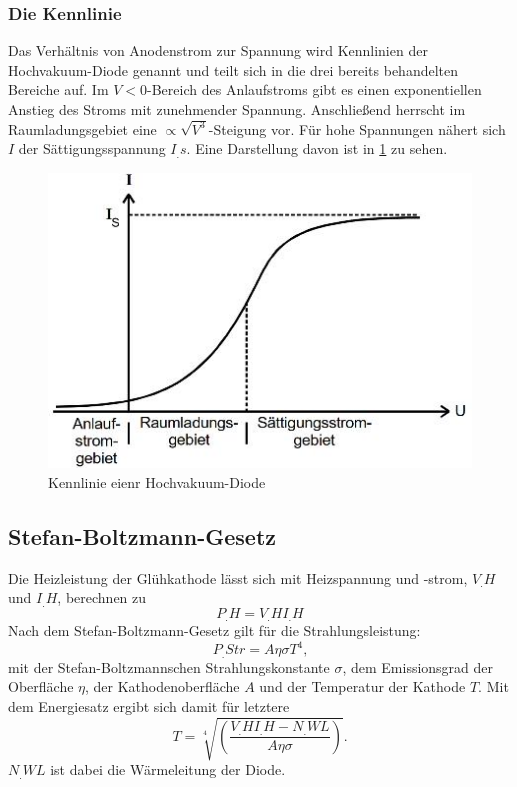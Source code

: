 \subsubsection{Die Kennlinie}
Das Verhältnis von Anodenstrom zur Spannung wird Kennlinien der Hochvakuum-Diode genannt und teilt sich in die drei bereits behandelten Bereiche auf.
Im $V<0$-Bereich des Anlaufstroms gibt es einen exponentiellen Anstieg des Stroms mit zunehmender Spannung. Anschließend herrscht im Raumladungsgebiet eine $\propto \sqrt{V^3}$-Steigung vor. Für hohe Spannungen nähert sich $I$ der Sättigungsspannung $I_.s$. Eine Darstellung davon ist in \ref{fig:Kenn} zu sehen.

\begin{figure}
\centering
\includegraphics[width=\linewidth-70pt,height=\textheight-70pt,keepaspectratio]{content/images/Kennlinie.jpg}
\caption{Kennlinie eienr Hochvakuum-Diode\cite{V504}}
\label{fig:Kenn}
\end{figure}

\subsection{Stefan-Boltzmann-Gesetz}
Die Heizleistung der Glühkathode lässt sich mit Heizspannung und -strom, $V_.H$ und $I_.H$, berechnen zu
\begin{equation*}
P_.H=V_.HI_.H
\end{equation*}
Nach dem Stefan-Boltzmann-Gesetz gilt für die Strahlungsleistung:
\begin{equation*}
P_.{Str}= A\eta\sigma T^4\text{,}
\end{equation*}
mit der Stefan-Boltzmannschen Strahlungskonstante $\sigma$, dem Emissionsgrad der Oberfläche $\eta$, der Kathodenoberfläche $A$ und der Temperatur der Kathode $T$.
Mit dem Energiesatz ergibt sich damit für letztere
\begin{equation}
T=\sqrt[4]{\left(\frac{V_.HI_.H-N_.{WL}}{A\eta\sigma}\right)}\text{.}\label{eq:T}
\end{equation}
$N_.{WL}$ ist dabei die Wärmeleitung der Diode.